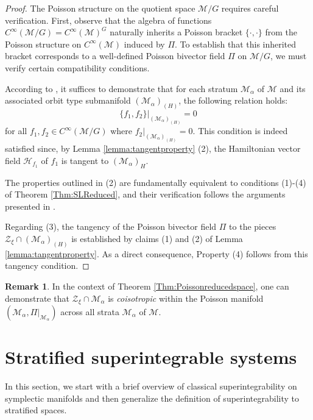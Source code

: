 \documentclass[12pt]{amsart}
\theoremstyle{definition}
\newtheorem{remark}[theorem]{Remark}
\numberwithin{equation}{section}
\newcommand{\Hamiltonian}[1]{\mathcal{H}_{#1}}
\newcommand{\CinfcalM}{C^\infty(\mathcal{M})}
\newcommand{\Cinf}{C^\infty}
\newcommand{\Zxi}{\mathcal{Z}_{\xi}}
\newcommand{\PoissonBracket}[1]{\{#1\}}
\begin{document}
	\begin{proof}
     The Poisson structure on the quotient space $\mathcal{M}/G$ requires careful verification. First, observe that the algebra of functions $\Cinf(\mathcal{M}/G)=\CinfcalM^G$ naturally inherits a Poisson bracket $\PoissonBracket{\cdot,\cdot}$ from the Poisson structure on $\Cinf(\mathcal{M})$ induced by $\Pi$. To establish that this inherited bracket corresponds to a well-defined Poisson bivector field $\Pi$ on $\mathcal{M}/G$, we must verify certain compatibility conditions.
		
	According to \cite[Proposition 4.5]{Pflaumpaper}, it suffices to demonstrate that for each stratum $\mathcal{M}_{\alpha}$ of $\mathcal{M}$ and its associated orbit type submanifold $(\mathcal{M}_{\alpha})_{(H)}$, the following relation holds:
		$$\PoissonBracket{f_1,f_2}|_{(\mathcal{M}_{\alpha})_{(H)}}=0$$
		for all $f_1,f_2\in \Cinf(\mathcal{M}/G)$ where $f_2|_{(\mathcal{M}_{\alpha})_{(H)}}=0$. This condition is indeed satisfied since, by Lemma \ref{lemma:tangentproperty} (2), the Hamiltonian vector field $\Hamiltonian{f_1}$ of $f_1$ is tangent to $(\mathcal{M}_{\alpha})_{H}$.
		
		The properties outlined in (2) are fundamentally equivalent to conditions (1)-(4) of Theorem \ref{Thm:SLReduced}, and their verification follows the arguments presented in \cite{SLannals,BatesLerman1997,Pflaumbook}. 
		
		Regarding (3), the tangency of the Poisson bivector field $\Pi$ to the pieces $\Zxi\cap (\mathcal{M}_{\alpha})_{(H)}$ is established by claims (1) and (2) of Lemma \ref{lemma:tangentproperty}. As a direct consequence, Property (4) follows from this tangency condition.
		
		
	\end{proof}
	\begin{remark}
		In the context of Theorem \ref{Thm:Poissonreducedspace}, one can demonstrate that $\Zxi\cap \mathcal{M}_{\alpha}$ is \textit{coisotropic} within the Poisson manifold $(\mathcal{M}_{\alpha},\Pi | _{\mathcal{M}_{\alpha}})$ across all strata $\mathcal{M}_{\alpha}$ of $\mathcal{M}$.
		
	\end{remark}
	 

\section{Stratified superintegrable systems}\label{Sec:Superintegrability}

In this section, we start with a brief overview of classical superintegrability on symplectic manifolds and then   generalize  the definition of
superintegrability to stratified spaces. 
\end{document}
